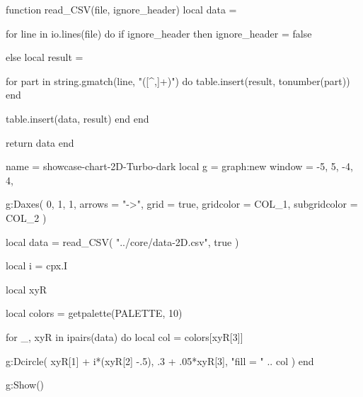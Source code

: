 \documentclass[theme = dark]{tutodoc}
\newcommand{\PALETTE}{Turbo}
\begin{document}

\vfill

\begin{luacode*}
function read_CSV(file, ignore_header)
  local data = {}

  for line in io.lines(file) do
    if ignore_header then
      ignore_header = false

    else
      local result = {}
      
      for part in string.gmatch(line, "([^,]+)") do
        table.insert(result, tonumber(part))
      end
      
      table.insert(data, result)
    end
  end

  return data
end
\end{luacode*}


\begin{luadraw}{name = showcase-chart-2D-\PALETTE-dark}
local g = graph:new{
  window = {-5, 5, -4, 4},
}

g:Daxes(
  {0, 1, 1},
  {
    arrows       = "->", 
    grid         = true,
    gridcolor    = COL_1,
    subgridcolor = COL_2
  }
)

local data = read_CSV(
  "../core/data-2D.csv",
  true
)

local i = cpx.I

local xyR
 
local colors = getpalette(PALETTE, 10)
 
for _, xyR in ipairs(data) do
  local col = colors[xyR[3]]

  g:Dcircle(
    xyR[1] + i*(xyR[2] -.5), .3 + .05*xyR[3],
    "fill = " .. col
  )
end

g:Show()
\end{luadraw}
\end{document}
